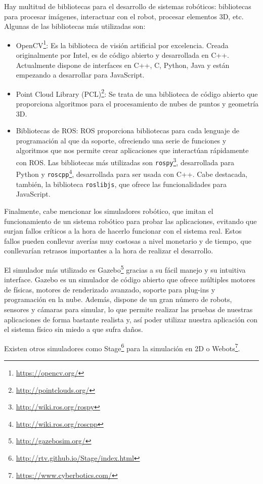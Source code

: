 Hay multitud de bibliotecas para el desarrollo de sistemas robóticos: bibliotecas para procesar imágenes, interactuar con el robot, procesar elementos 3D, etc. Algunas de las bibliotecas más utilizadas son:
\begin{itemize}
	\item OpenCV\footnote{\url{https://opencv.org/}}: Es la biblioteca de visión artificial por excelencia. Creada originalmente por Intel, es de código abierto y desarrollada en C++. Actualmente dispone de interfaces en C++, C, Python, Java y están empezando a desarrollar para JavaScript.
	\item Point Cloud Library (PCL)\footnote{\url{http://pointclouds.org/}}: Se trata de una biblioteca de código abierto que proporciona algoritmos para el procesamiento de nubes de puntos y geometría 3D.
	\item Bibliotecas de ROS: ROS proporciona bibliotecas para cada lenguaje de programación al que da soporte, ofreciendo una serie de funciones y algoritmos que nos permite crear aplicaciones que interactúan rápidamente con ROS. Las bibliotecas más utilizadas son \texttt{rospy}\footnote{\url{http://wiki.ros.org/rospy}}, desarrollada para Python y \texttt{roscpp}\footnote{\url{http://wiki.ros.org/roscpp}}, desarrollada para ser usada con C++. Cabe destacada, también, la biblioteca \texttt{roslibjs}, que ofrece las funcionalidades para JavaScript.
\end{itemize}

Finalmente, cabe mencionar los simuladores robótico, que imitan el funcionamiento de un sistema robótico para probar las aplicaciones, evitando que surjan fallos críticos a la hora de hacerlo funcionar con el sistema real. Estos fallos pueden conllevar averías muy costosas a nivel monetario y de tiempo, que conllevarían retrasos importantes a la hora de realizar el desarrollo. 

El simulador más utilizado es Gazebo\footnote{\url{http://gazebosim.org/}} gracias a su fácil manejo y su intuitiva interface. Gazebo es un simulador de código abierto que ofrece múltiples motores de físicas, motores de renderizado avanzado, soporte para plug-ins y programación en la nube. Además, dispone de un gran número de robots, sensores y cámaras para simular, lo que permite realizar las pruebas de nuestras aplicaciones de forma bastante realista y, así poder utilizar nuestra aplicación con el sistema físico sin miedo a que sufra daños.

Existen otros simuladores como Stage\footnote{\url{http://rtv.github.io/Stage/index.html}} para la simulación en 2D o Webots\footnote{\url{https://www.cyberbotics.com/}}.

